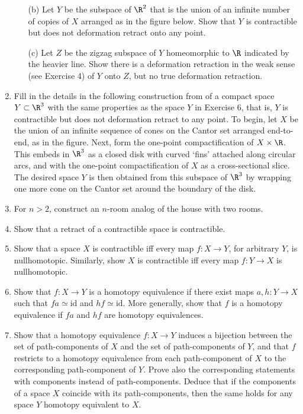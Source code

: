 \begin{enumerate}
\begin{enumerate}
\item[(b)] Let $Y$ be the subspace of $\R^2$ that is the union of an infinite number
of copies of $X$ arranged as in the figure below. Show that $Y$ is contractible but
does not deformation retract onto any point.



\item[(c)] Let $Z$ be the zigzag subspace of $Y$ homeomorphic to $\R$ indicated by
the heavier line. Show there is a deformation retraction in the weak sense (see
Exercise 4) of $Y$ onto $Z$, but no true deformation retraction.
\end{enumerate}

\item Fill in the details in the following construction from \cite{Edwards1999} of a
compact space $Y \subset \R^3$ with the same properties as the space $Y$ in Exercise 6,
that is, $Y$ is contractible but does not deformation retract to any point. To begin, let
$X$ be the union of an infinite sequence of cones on the Cantor set arranged
end-to-end, as in the figure. Next, form the one-point compactification of
$X \times \R$. This embeds in $\R^3$ as a closed disk with curved `fins' attached along
circular arcs, and with the one-point compactification of $X$ as a cross-sectional slice.
The desired space $Y$ is then obtained from this subspace of $\R^3$ by wrapping one
more cone on the Cantor set around the boundary of the disk.



\item For $n > 2$, construct an $n$-room analog of the house with two rooms.

\item Show that a retract of a contractible space is contractible.

\item Show that a space $X$ is contractible iff every map $f : X \to Y$, for arbitrary
$Y$, is nullhomotopic. Similarly, show $X$ is contractible iff every map $f : Y \to X$ is
nullhomotopic.

\item Show that $f : X \to Y$ is a homotopy equivalence if there exist maps
$a, h : Y \to X$ such that $fa \simeq \mathrm{id}$ and $hf \simeq \mathrm{id}$. More generally, show that
$f$ is a homotopy equivalence if $fa$ and $hf$ are homotopy equivalences.

\item Show that a homotopy equivalence $f : X \to Y$ induces a bijection between
the set of path-components of $X$ and the set of path-components of $Y$, and that $f$
restricts to a homotopy equivalence from each path-component of $X$ to the
corresponding path-component of $Y$. Prove also the corresponding statements with
components instead of path-components. Deduce that if the components of a space
$X$ coincide with its path-components, then the same holds for any space $Y$
homotopy equivalent to $X$.


\end{enumerate}
